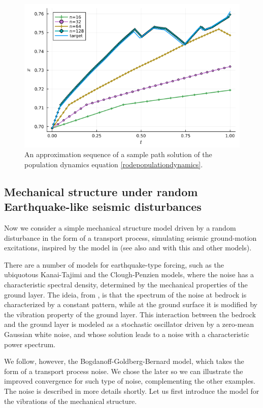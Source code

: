 \documentclass[reqno,12pt]{amsart}
\theoremstyle{plain} %
\theoremstyle{definition} %
\begin{document}
\begin{figure}[htb]
    \includegraphics[scale=0.6]{img/sample_popdyn_gBmPoisson.png}
    \caption{An approximation sequence of a sample path solution of the population dynamics equation \eqref{rodepopulationdynamics}.}
    \label{figsamplepopdyn}
\end{figure}

\subsection{Mechanical structure under random Earthquake-like seismic disturbances}

Now we consider a simple mechanical structure model driven by a random disturbance in the form of a transport process, simulating seismic ground-motion excitations, inspired by the model in \cite{BogdanoffGoldbergBernard1961} (see also \cite[Chapter 18]{NeckelRupp2013} and \cite{HousnerJenning1964} with this and other models).

There are a number of models for earthquake-type forcing, such as the ubiquotous Kanai-Tajimi and the Clough-Penzien models, where the noise has a characteristic spectral density, determined by the mechanical properties of the ground layer. The ideia, from \cite{Kanai1957}, is that the spectrum of the noise at bedrock is characterized by a constant pattern, while at the ground surface it is modified by the vibration property of the ground layer. This interaction between the bedrock and the ground layer is modeled as a stochastic oscillator driven by a zero-mean Gaussian white noise, and whose solution leads to a noise with a characteristic power spectrum.

We follow, however, the Bogdanoff-Goldberg-Bernard model, which takes the form of a transport process noise. We chose the later so we can illustrate the improved convergence for such type of noise, complementing the other examples. The noise is described in more details shortly. Let us first introduce the model for the vibrations of the mechanical structure.
\end{document}
